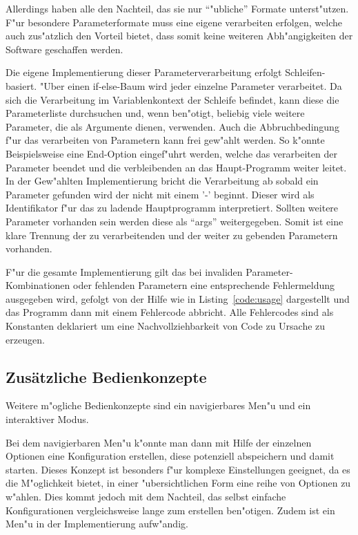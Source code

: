 Allerdings haben alle den Nachteil, das sie nur "`"ubliche"' Formate unterst"utzen. F"ur besondere Parameterformate muss eine eigene verarbeiten erfolgen, welche auch zus"atzlich den Vorteil bietet, dass somit keine weiteren Abh"angigkeiten der Software geschaffen werden.

Die eigene Implementierung dieser Parameterverarbeitung erfolgt Schleifen-basiert. "Uber einen if-else-Baum wird jeder einzelne Parameter verarbeitet. Da sich die Verarbeitung im Variablenkontext der Schleife befindet, kann diese die Parameterliste durchsuchen und, wenn ben"otigt, beliebig viele weitere Parameter, die als Argumente dienen, verwenden. Auch die Abbruchbedingung f"ur das verarbeiten von Parametern kann frei gew"ahlt werden. So k"onnte Beispielsweise eine End-Option eingef"uhrt werden, welche das verarbeiten der Parameter beendet und die verbleibenden an das Haupt-Programm weiter leitet. In der Gew"ahlten Implementierung bricht die Verarbeitung ab sobald ein Parameter gefunden wird der nicht mit einem '-' beginnt. Dieser wird als Identifikator f"ur das zu ladende Hauptprogramm interpretiert. Sollten weitere Parameter vorhanden sein werden diese als "`args"' weitergegeben. Somit ist eine klare Trennung der zu verarbeitenden und der weiter zu gebenden Parametern vorhanden.

F"ur die gesamte Implementierung gilt das bei invaliden Parameter-Kombinationen oder fehlenden Parametern eine entsprechende Fehlermeldung ausgegeben wird, gefolgt von der Hilfe wie in Listing~\ref{code:usage} dargestellt und das Programm dann mit einem Fehlercode abbricht. Alle Fehlercodes sind als Konstanten deklariert um eine Nachvollziehbarkeit von Code zu Ursache zu erzeugen.

 

\subsection{Zusätzliche Bedienkonzepte}

Weitere m"ogliche Bedienkonzepte sind ein navigierbares Men"u und ein interaktiver Modus.

Bei dem navigierbaren Men"u k"onnte man dann mit Hilfe der einzelnen Optionen eine Konfiguration erstellen, diese potenziell abspeichern und damit starten. Dieses Konzept ist besonders f"ur komplexe Einstellungen geeignet, da es die M"oglichkeit bietet, in einer "ubersichtlichen Form eine reihe von Optionen zu w"ahlen. Dies kommt jedoch mit dem Nachteil, das selbst einfache Konfigurationen vergleichsweise lange zum erstellen ben"otigen. Zudem ist ein Men"u in der Implementierung aufw"andig.

